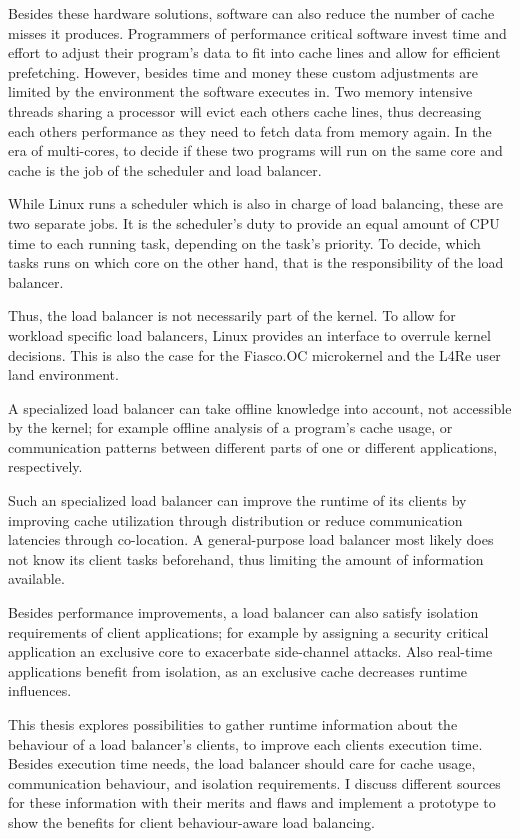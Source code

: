 Besides these hardware solutions, software can also reduce the number of cache
misses it produces.
Programmers of performance critical software invest time and effort to adjust
their program's data to fit into cache lines and allow for efficient prefetching.
However, besides time and money these custom adjustments are limited by the
environment the software executes in.
Two memory intensive threads sharing a processor will evict each others
cache lines, thus decreasing each others performance as they need to fetch
data from memory again.
In the era of multi-cores, to decide if these two programs will run on
the same core and cache is the job of the scheduler and load balancer.

While Linux runs a scheduler which is also in charge of load balancing, these
are two separate jobs.
It is the scheduler's duty to provide an equal amount of CPU time to each
running task, depending on the task's priority.
To decide, which tasks runs on which core on the other hand,
that is the responsibility of the load balancer.

Thus, the load balancer is not necessarily part of the kernel.
To allow for workload specific load balancers, Linux provides an interface to
overrule kernel decisions.
This is also the case for the Fiasco.OC microkernel and the L4Re user land
environment.

A specialized load balancer can take offline knowledge into account, not
accessible by the kernel;
for example offline analysis of a program's cache usage, or communication
patterns between different parts of one or different applications,
respectively.

Such an specialized load balancer can improve the runtime of its clients by
improving cache utilization through distribution or reduce communication latencies
through co-location.
A general-purpose load balancer most likely does not know its client tasks
beforehand, thus limiting the amount of information available.

Besides performance improvements, a load balancer can also satisfy isolation
requirements of client applications; for example by assigning a security
critical application an exclusive core to exacerbate side-channel attacks.
Also real-time applications benefit from isolation, as an exclusive cache
decreases runtime influences.

This thesis explores possibilities to gather runtime information about the
behaviour of a load balancer's clients, to improve each clients execution time.
Besides execution time needs, the load balancer should care for cache usage,
communication behaviour, and isolation requirements.
I discuss different sources for these information with their merits and flaws and
implement a prototype to show the benefits for client behaviour-aware load
balancing.


